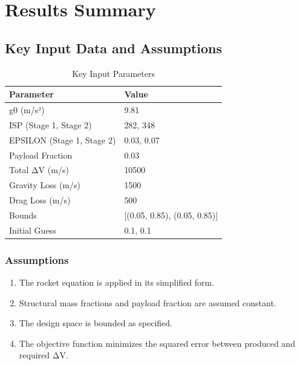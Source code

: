 \documentclass{article}
\begin{document}
\section*{Results Summary}

\subsection*{Key Input Data and Assumptions}
\begin{table}[ht]
\centering
\begin{tabular}{ll}
\toprule
\textbf{Parameter} & \textbf{Value} \\
\midrule
g0 (m/s²) & 9.81 \\
ISP (Stage 1, Stage 2) & 282, 348 \\
EPSILON (Stage 1, Stage 2) & 0.03, 0.07 \\
Payload Fraction & 0.03 \\
Total ΔV (m/s) & 10500 \\
Gravity Loss (m/s) & 1500 \\
Drag Loss (m/s) & 500 \\
Bounds & [(0.05, 0.85), (0.05, 0.85)] \\
Initial Guess & 0.1, 0.1 \\
\bottomrule
\end{tabular}
\caption{Key Input Parameters}
\end{table}

\subsubsection*{Assumptions}

\begin{enumerate}
    \item The rocket equation is applied in its simplified form.
    \item Structural mass fractions and payload fraction are assumed constant.
    \item The design space is bounded as specified.
    \item The objective function minimizes the squared error between produced and required ΔV.
\end{enumerate}
\end{document}
